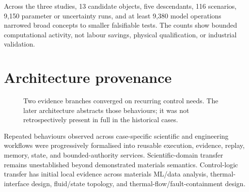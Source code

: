 \documentclass[11pt,a4paper,oneside]{report}
\begin{document}
Across the three studies, 13 candidate objects, five descendants, 116 scenarios, 9,150 parameter or uncertainty runs, and at least 9,380 model operations narrowed broad concepts to smaller falsifiable tests. The counts show bounded computational activity, not labour savings, physical qualification, or industrial validation.



\section{Architecture provenance}

\begin{figure}[H]
\centering
{}
\caption{Two evidence branches converged on recurring control needs. The later architecture abstracts those behaviours; it was not retrospectively present in full in the historical cases.}
\label{fig:architecture-provenance}
\end{figure}

Repeated behaviours observed across case-specific scientific and engineering workflows were progressively formalised into reusable execution, evidence, replay, memory, state, and bounded-authority services. Scientific-domain transfer remains unestablished beyond demonstrated materials semantics. Control-logic transfer has initial local evidence across materials ML/data analysis, thermal-interface design, fluid/state topology, and thermal-flow/fault-containment design.
\end{document}
